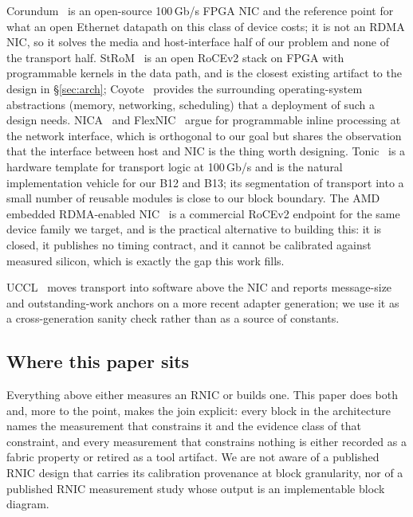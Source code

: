 Corundum~\cite{corundum2020} is an open-source 100\,Gb/s FPGA NIC and the
reference point for what an open Ethernet datapath on this class of device
costs; it is not an RDMA NIC, so it solves the media and host-interface half of
our problem and none of the transport half. StRoM~\cite{strom2020} is an
open RoCEv2 stack on FPGA with programmable kernels in the data path, and is the
closest existing artifact to the design in \S\ref{sec:arch};
Coyote~\cite{coyote2020} provides the surrounding operating-system abstractions
(memory, networking, scheduling) that a deployment of such a design needs.
NICA~\cite{nica2019} and FlexNIC~\cite{flexnic2016} argue for programmable
inline processing at the network interface, which is orthogonal to our goal but
shares the observation that the interface between host and NIC is the thing
worth designing. Tonic~\cite{tonic2020} is a hardware template for transport
logic at 100\,Gb/s and is the natural implementation vehicle for our B12 and
B13; its segmentation of transport into a small number of reusable modules is
close to our block boundary. The AMD embedded RDMA-enabled NIC~\cite{ernic} is
a commercial RoCEv2 endpoint for the same device family we target, and is the
practical alternative to building this: it is closed, it publishes no timing
contract, and it cannot be calibrated against measured silicon, which is
exactly the gap this work fills.

UCCL~\cite{uccl2025} moves transport into software above the NIC and reports
message-size and outstanding-work anchors on a more recent adapter generation;
we use it as a cross-generation sanity check rather than as a source of
constants. 

\subsection{Where this paper sits}

Everything above either measures an RNIC or builds one. This paper does both
and, more to the point, makes the join explicit: every block in the architecture
names the measurement that constrains it and the evidence class of that
constraint, and every measurement that constrains nothing is either recorded as
a fabric property or retired as a tool artifact. We are not aware of a published
RNIC design that carries its calibration provenance at block granularity, nor of
a published RNIC measurement study whose output is an implementable block
diagram.
